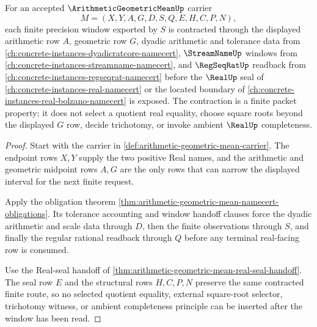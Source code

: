 \begin{theorem}
\label{thm:arithmetic-geometric-mean-window-contraction}
For an accepted $\ArithmeticGeometricMeanUp$ carrier
$$
M=(X,Y,A,G,D,S,Q,E,H,C,P,N),
$$
each finite precision window exported by $S$ is contracted through the displayed arithmetic row $A$, geometric row $G$, dyadic arithmetic and tolerance data from \autoref{ch:concrete-instances-dyadicratcore-namecert}, $\StreamNameUp$ windows from \autoref{ch:concrete-instances-streamname-namecert}, and $\RegSeqRatUp$ readback from \autoref{ch:concrete-instances-regseqrat-namecert} before the $\RealUp$ seal of \autoref{ch:concrete-instances-real-namecert} or the located boundary of \autoref{ch:concrete-instances-real-bolzano-namecert} is exposed. The contraction is a finite packet property; it does not select a quotient real equality, choose square roots beyond the displayed $G$ row, decide trichotomy, or invoke ambient $\RealUp$ completeness.
\end{theorem}
\begin{proof}
Start with the carrier in \autoref{def:arithmetic-geometric-mean-carrier}. The endpoint rows $X,Y$ supply the two positive Real names, and the arithmetic and geometric midpoint rows $A,G$ are the only rows that can narrow the displayed interval for the next finite request.

Apply the obligation theorem \autoref{thm:arithmetic-geometric-mean-namecert-obligations}. Its tolerance accounting and window handoff clauses force the dyadic arithmetic and scale data through $D$, then the finite observations through $S$, and finally the regular rational readback through $Q$ before any terminal real-facing row is consumed.

Use the Real-seal handoff of \autoref{thm:arithmetic-geometric-mean-real-seal-handoff}. The seal row $E$ and the structural rows $H,C,P,N$ preserve the same contracted finite route, so no selected quotient equality, external square-root selector, trichotomy witness, or ambient completeness principle can be inserted after the window has been read.
\end{proof}



